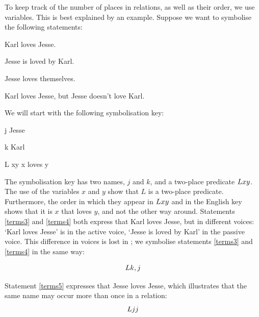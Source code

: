 \documentclass[PHIL101-Textbook.tex]{subfiles}
\begin{document}
To keep track of the number of places in relations, as well as their order, we use variables. 
This is best explained by an example.
Suppose we want to symbolise the following statements:
\begin{earg}
\item[\ex{terms3}] Karl loves Jesse.
\item[\ex{terms4}] Jesse is loved by Karl. 
\item[\ex{terms5}] Jesse loves themselves. 
\item[\ex{terms6}] Karl loves Jesse, but Jesse doesn't love Karl. 
\end{earg}
We will start with the following symbolisation key:
\begin{ekey}
\item[j] Jesse
\item[k] Karl
\item[\atom L xy ] x loves y
\end{ekey}

\noindent The symbolisation key has two names, $j$ and $k$, and a two-place predicate $\mathord{L}{x}y $.
The use of the variables $x$ and $y$ show that $L$ is a two-place predicate.
Furthermore, the order in which they appear in $\mathord{L}{x}y $ and in the English key shows that it is $x$ that loves $y$, and not the other way around.
Statements \ref{terms3} and \ref{terms4} both express that Karl loves Jesse, but in different voices: `Karl loves Jesse' is in the active voice, `Jesse is loved by Karl' in the passive voice.
This difference in voices is lost in \pl; we symbolise statements \ref{terms3} and \ref{terms4} in the same way:

\[
  \begin{array}{l}
    \mathord{L}{k,j} \\
  \end{array}
\]

\noindent Statement \ref{terms5} expresses that Jesse loves Jesse, which illustrates that the same name may occur more than once in a relation:
$$\mathord{L}{j}j$$
\end{document}
